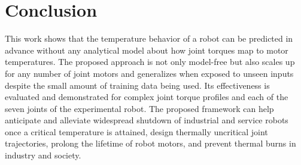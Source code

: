 \documentclass{ifacconf}
\begin{document}
\section{Conclusion}
This work shows that the temperature behavior of a robot can be predicted in advance without any analytical  model about how joint torques map to motor temperatures. The proposed approach is not only model-free but also scales up for any number of joint motors and generalizes when exposed to  unseen inputs despite the small amount of training data being used. Its effectiveness is evaluated and demonstrated for complex joint torque profiles and  each of the seven joints of the experimental robot. The proposed framework can help anticipate and alleviate widespread shutdown  of industrial and service robots once a critical temperature  is attained, design thermally uncritical joint trajectories, prolong the lifetime of robot motors, and prevent thermal burns in industry and society.


                                                   




\end{document}

